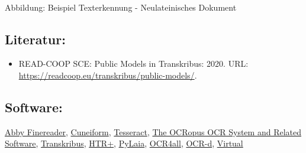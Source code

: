 \documentclass{article}
\begin{document}
        \\
            
        Abbildung: Beispiel Texterkennung - Neulateinisches Dokument\\
            
        \subsection*{Literatur:}\begin{itemize}\item READ-COOP SCE: Public Models in Transkribus: 2020. URL: \url{https://readcoop.eu/transkribus/public-models/}.\end{itemize}\subsection*{Software:}\href{https://www.abbyy.com/de-de/}{Abby
                           Finereader}, \href{https://launchpad.net/cuneiform-linux}{Cuneiform}, \href{https://github.com/tesseract-ocr/}{Tesseract}, \href{https://github.com/tmbarchive/ocropy}{The
                           OCRopus OCR System and Related Software}, \href{https://transkribus.eu/Transkribus/}{Transkribus}, \href{https://readcoop.eu/wp-content/uploads/2018/12/D7.9_HTR_NN_final.pdf}{HTR+}, \href{https://github.com/jpuigcerver/PyLaia}{PyLaia}, \href{https://github.com/OCR4all}{OCR4all}, \href{https://github.com/OCR-D}{OCR-d}, \href{http://wlt.synat.pcss.pl/}{Virtual
}
\end{document}
